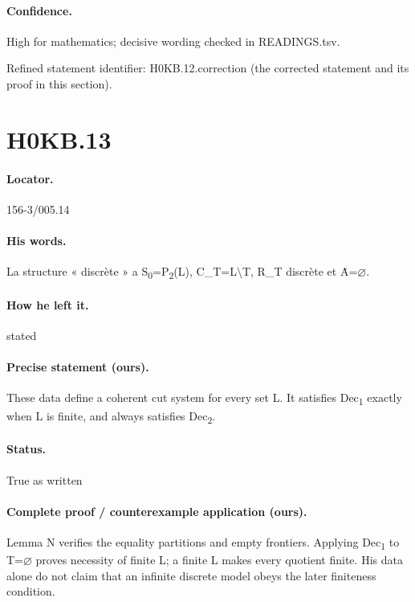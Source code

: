 \paragraph{Confidence.} High for mathematics; decisive wording checked in READINGS.tsv.

\noindent Refined statement identifier: H0KB.12.correction (the corrected statement and its proof in this section).

\section*{H0KB.13}\label{statement:H0KB.13}
\paragraph{Locator.} 156-3/005.14

\paragraph{His words.} La structure « discrète » a S\textsubscript{0}=P\textsubscript{2}(L), C\_T=L\ensuremath{\setminus}T, R\_T discrète et Ȧ=\ensuremath{\varnothing}.

\paragraph{How he left it.} stated

\paragraph{Precise statement (ours).} These data define a coherent cut system for every set L. It satisfies Dec\textsubscript{1} exactly when L is finite, and always satisfies Dec\textsubscript{2}.

\paragraph{Status.} True as written

\paragraph{Complete proof / counterexample application (ours).} Lemma N verifies the equality partitions and empty frontiers. Applying Dec\textsubscript{1} to T=\ensuremath{\varnothing} proves necessity of finite L; a finite L makes every quotient finite. His data alone do not claim that an infinite discrete model obeys the later finiteness condition.

